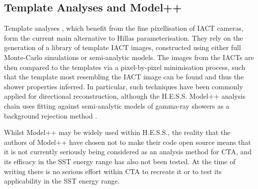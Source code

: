 \subsection{Template Analyses and Model++}
Template analyses \cite{cat} \cite{3danalysis} \cite{model++} \cite{impact}, which benefit from the fine pixellisation of IACT cameras, form the current main alternative to Hillas parameterisation. They rely on the generation of a library of template IACT images, constructed using either full Monte-Carlo simulations or semi-analytic models. The images from the IACTs are then compared to the templates via a pixel-by-pixel minimisation process, such that the template most resembling the IACT image can be found and thus the shower properties inferred. In particular, such techniques have been commonly applied for directional reconstruction, although the H.E.S.S. Model++ analysis chain uses fitting against semi-analytic models of gamma-ray showers as a background rejection method \cite{model++}.

Whilst Model++ may be widely used within H.E.S.S., the reality that the authors of Model++ have chosen not to make their code open source means that it is not currently seriously being considered as an analysis method for CTA, and its efficacy in the SST energy range has also not been tested. At the time of writing there is no serious effort within CTA to recreate it or to test its applicability in the SST energy range.

